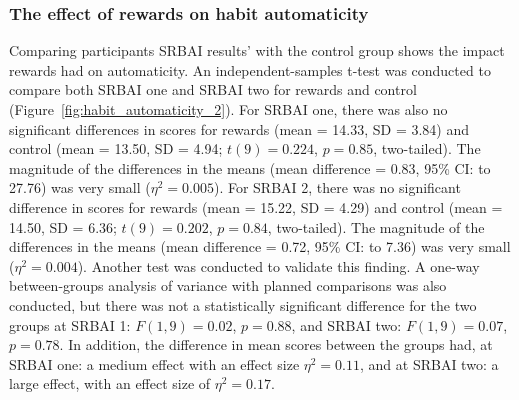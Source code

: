 \documentclass{scaffold/sigchi}
\begin{document}
\subsubsection{The effect of rewards on habit automaticity}
Comparing participants SRBAI results' with the control group shows the impact rewards had on automaticity.
An independent-samples t-test was conducted to compare both SRBAI one and SRBAI two for rewards and control (Figure~\ref{fig:habit_automaticity_2}). For SRBAI one, there was also no significant differences in scores for rewards (mean = 14.33, SD = 3.84) and control (mean = 13.50, SD = 4.94; $t(9) = 0.224$, $p = 0.85$,
two-tailed). The magnitude of the differences in the means (mean difference = 0.83,
95\% CI:  to 27.76) was very small ($\eta^{2} = 0.005$). For SRBAI 2, there was no significant difference in scores for rewards
(mean = 15.22, SD = 4.29) and control (mean = 14.50, SD = 6.36; $t(9) = 0.202$, $p = 0.84$,
two-tailed). The magnitude of the differences in the means (mean difference = 0.72,
95\% CI:  to 7.36) was very small ($\eta^{2} = 0.004$). Another test was conducted to validate this finding. A one-way between-groups analysis of variance with planned comparisons was also conducted, but there was not a statistically significant difference for the two groups at SRBAI 1: $F(1,9) = 0.02$, $p = 0.88$, and SRBAI two: $F(1,9) = 0.07$, $p = 0.78$. In addition, the difference in mean scores between the groups had, at SRBAI one: a medium effect with an effect size $\eta^{2} = 0.11$, and at SRBAI two: a large effect, with an effect size of $\eta^{2} = 0.17$.

\end{document}
